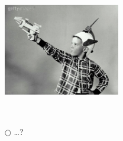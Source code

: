 \NEWSEC

\subsection{\ssFutureRadiation}

\begin{frame}[fragile,label=ss-future-radiation] 
\secframetitle{\ssFutureRadiation}
\begin{center}
\begin{minipage}{3.6in}
\begin{enumerate}
\item[\redcirc] \highpriority\ 
\item[\redcirc] \highpriority\  \ \\
\centerline{\includegraphics[width=2.0in]{Images/remco_gun_boy2.jpg}}
\item[\redcirc] \highpriority\ 
\pause
\item[$\bigcirc$] \ldots ?
\end{enumerate}
\end{minipage}
\end{center}
\end{frame}

